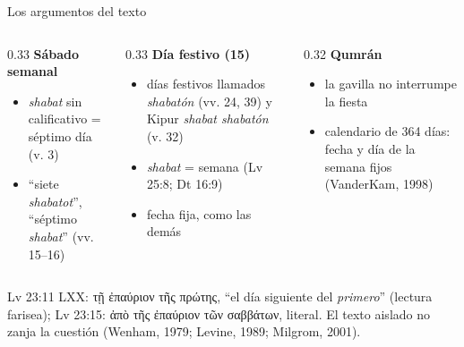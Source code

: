 \documentclass[hyperref={bookmarks=false},aspectratio=169]{beamer}
\newcommand{\grc}[1]{\foreignlanguage{ancientgreek}{#1}}
\begin{document}
\begin{frame}{Los argumentos del texto}
\begin{columns}[t,onlytextwidth]
\begin{column}{0.33\textwidth}\scriptsize\RaggedRight
\textbf{\color{tierraroja}Sábado semanal}
\begin{itemize}
\item \emph{shabat} sin calificativo = séptimo día (v. 3)
\item ``siete \emph{shabatot}'', ``séptimo \emph{shabat}'' (vv. 15--16)
\end{itemize}
\end{column}
\begin{column}{0.33\textwidth}\scriptsize\RaggedRight
\textbf{\color{tierraroja}Día festivo (15)}
\begin{itemize}
\item días festivos llamados \emph{shabatón} (vv. 24, 39) y Kipur \emph{shabat shabatón} (v. 32)
\item \emph{shabat} = semana (Lv 25:8; Dt 16:9)
\item fecha fija, como las demás
\end{itemize}
\end{column}
\begin{column}{0.32\textwidth}\scriptsize\RaggedRight
\textbf{\color{tierraroja}Qumrán}
\begin{itemize}
\item la gavilla no interrumpe la fiesta
\item calendario de 364 días: fecha y día de la semana fijos (VanderKam, 1998)
\end{itemize}
\end{column}
\end{columns}\medskip
\begin{tcolorbox}[colback=mostaza!12,colframe=mostaza!85!tierraroja,boxrule=0.6pt,arc=2pt,title={\scriptsize\bfseries Precisión textual: la LXX},coltitle=caferojizo,colbacktitle=mostaza!30,fontupper=\scriptsize]
\RaggedRight Lv 23:11 LXX: \grc{τῇ ἐπαύριον τῆς πρώτης}, ``el día siguiente del \emph{primero}'' (lectura farisea); Lv 23:15: \grc{ἀπὸ τῆς ἐπαύριον τῶν σαββάτων}, literal. El texto aislado no zanja la cuestión (Wenham, 1979; Levine, 1989; Milgrom, 2001).
\end{tcolorbox}
\end{frame}
\end{document}
